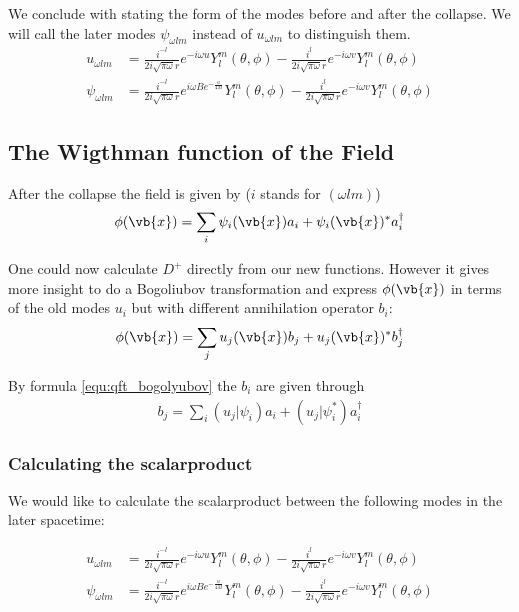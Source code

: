 We conclude with stating the form of the modes before and after the collapse. We will call the later modes \(\psi_{\omega l m}\) instead of \(u_{\omega l m}\) to distinguish them. 
\begin{align}
u_{\omega l m} &= \frac{i^{-l}}{2i\sqrt{\pi\omega}r} e^{-i\omega u} Y_l^m (\theta, \phi) - \frac{i^{l}}{2i\sqrt{\pi\omega}r} e^{-i\omega v} Y_l^m (\theta, \phi)\\
\psi_{\omega l m} &= \frac{i^{-l}}{2i\sqrt{\pi\omega}r} e^{i\omega B e^{-\frac{u}{4M}}} Y_l^m (\theta, \phi) - \frac{i^{l}}{2i\sqrt{\pi\omega}r} e^{-i\omega v} Y_l^m (\theta, \phi)
\end{align}

\subsection{The Wigthman function of the Field}

After the collapse the field is given by (\(i\) stands for \((\omega l m)\))
\begin{align}
\phi(\vb{x}) = \sum_i \psi_i(\vb{x}) a_i + \psi_i(\vb{x})^* a_i^\dagger
\end{align}

One could now calculate \(D^+\) directly from our new functions. However it gives more insight to do a Bogoliubov transformation and express \(\phi(\vb{x})\) in terms of the old modes \(u_i\) but with different annihilation operator \(b_i\):
\begin{align}
\phi(\vb{x}) = \sum_j u_j(\vb{x}) b_j + u_j(\vb{x})^* b_j^\dagger
\end{align}

By formula \ref{equ:qft_bogolyubov} the \(b_i\) are given through
\begin{align}
b_j = \sum_i (u_j|\psi_i) a_i + (u_j|\psi_i^*) a_i^\dagger
\end{align}

\subsubsection{Calculating the scalarproduct}
\label{sec:app_scalarproduct}
We would like to calculate the scalarproduct between the following modes in the later spacetime:

\begin{align}
u_{\omega l m} &= \frac{i^{-l}}{2i\sqrt{\pi\omega}r} e^{-i\omega u} Y_l^m (\theta, \phi) - \frac{i^{l}}{2i\sqrt{\pi\omega}r} e^{-i\omega v} Y_l^m (\theta, \phi)\\
\psi_{\omega l m} &= \frac{i^{-l}}{2i\sqrt{\pi\omega}r} e^{i\omega B e^{-\frac{u}{4M}}} Y_l^m (\theta, \phi) - \frac{i^{l}}{2i\sqrt{\pi\omega}r} e^{-i\omega v} Y_l^m (\theta, \phi)
\end{align}

